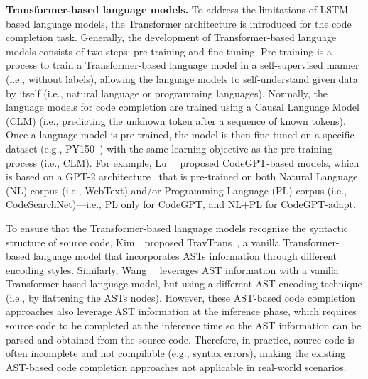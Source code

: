 \textbf{Transformer-based language models.} 
To address the limitations of LSTM-based language models, the Transformer architecture is introduced for the code completion task.
Generally, the development of Transformer-based language models consists of two steps: pre-training and fine-tuning.
Pre-training is a process to train a Transformer-based language model in a self-supervised manner (i.e., without labels), allowing the language models to self-understand given data by itself (i.e., natural language or programming languages).
Normally, the language models for code completion are trained using a Causal Language Model (CLM) (i.e., predicting the unknown token after a sequence of known tokens).
Once a language model is pre-trained, the model is then fine-tuned on a specific dataset (e.g., PY150~\cite{raychev2016probabilistic}) with the same learning objective as the pre-training process (i.e., CLM).
For example, Lu~\ea~\cite{lu2021codexglue} proposed CodeGPT-based models, which is based on a GPT-2 architecture~\cite{radford2019language} that is pre-trained on both Natural Language (NL) corpus (i.e., WebText) and/or Programming Language (PL) corpus (i.e., CodeSearchNet)---i.e., PL only for CodeGPT, and NL+PL for CodeGPT-adapt.

To ensure that the Transformer-based language models recognize the syntactic structure of source code, Kim~\ea~proposed TravTrans~\cite{kim2021code}, a vanilla Transformer-based language model that incorporates ASTs information through different encoding styles.
Similarly, Wang~\ea~\cite{wang2021code} leverages AST information with a vanilla Transformer-based language model, but using a different AST encoding technique (i.e., by flattening the ASTs nodes).
However, these AST-based code completion approaches also leverage AST information at the inference phase, which requires source code to be completed at the inference time so the AST information can be parsed and obtained from the source code. 
Therefore, in practice, source code is often incomplete and not compilable (e.g., syntax errors), making the existing AST-based code completion approaches not applicable in real-world scenarios.




